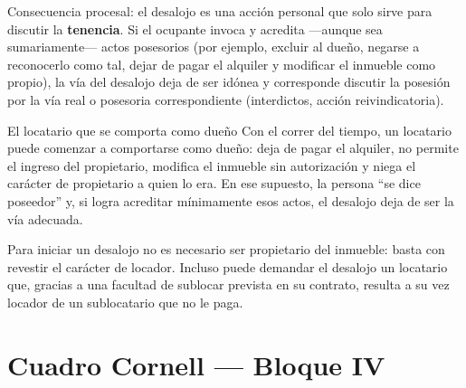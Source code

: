 \documentclass[12pt,oneside]{book}
\begin{document}
\begin{important}
Consecuencia procesal: el desalojo es una acción personal que solo sirve para discutir la \textbf{tenencia}. Si el ocupante invoca y acredita —aunque sea sumariamente— actos posesorios (por ejemplo, excluir al dueño, negarse a reconocerlo como tal, dejar de pagar el alquiler y modificar el inmueble como propio), la vía del desalojo deja de ser idónea y corresponde discutir la posesión por la vía real o posesoria correspondiente (interdictos, acción reivindicatoria).
\end{important}

\begin{example}{El locatario que se comporta como dueño}
Con el correr del tiempo, un locatario puede comenzar a comportarse como dueño: deja de pagar el alquiler, no permite el ingreso del propietario, modifica el inmueble sin autorización y niega el carácter de propietario a quien lo era. En ese supuesto, la persona ``se dice poseedor'' y, si logra acreditar mínimamente esos actos, el desalojo deja de ser la vía adecuada.
\end{example}

\begin{note}
Para iniciar un desalojo no es necesario ser propietario del inmueble: basta con revestir el carácter de locador. Incluso puede demandar el desalojo un locatario que, gracias a una facultad de sublocar prevista en su contrato, resulta a su vez locador de un sublocatario que no le paga.
\end{note}

\section*{Cuadro Cornell — Bloque IV}
\end{document}
